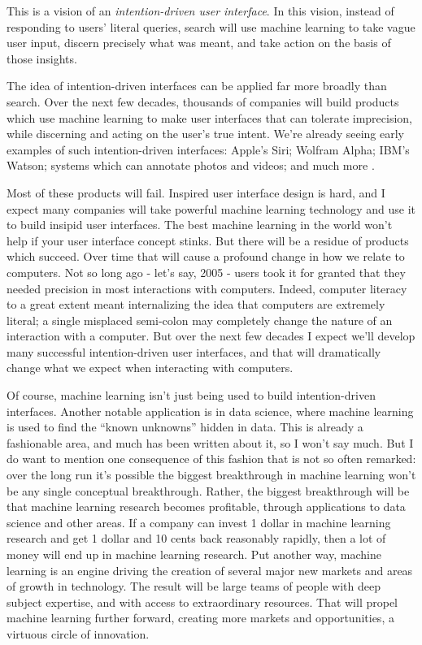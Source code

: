 This is a vision of an \textit{intention-driven user interface}. In this vision, instead of responding to users' literal queries, search will use machine learning to take vague user input, discern precisely what was meant, and take action on the basis of those insights.

The idea of intention-driven interfaces can be applied far more broadly than search. Over the next few decades, thousands of companies will build products which use machine learning to make user interfaces that can tolerate imprecision, while discerning and acting on the user's true intent. We're already seeing early examples of such intention-driven interfaces: Apple's Siri; Wolfram Alpha; IBM's Watson; systems which can annotate photos and videos; and much more \cite{VinyalsTBE2014}.

Most of these products will fail. Inspired user interface design is hard, and I expect many companies will take powerful machine learning technology and use it to build insipid user interfaces. The best machine learning in the world won't help if your user interface concept stinks. But there will be a residue of products which succeed. Over time that will cause a profound change in how we relate to computers. Not so long ago - let's say, 2005 - users took it for granted that they needed precision in most interactions with computers. Indeed, computer literacy to a great extent meant internalizing the idea that computers are extremely literal; a single misplaced semi-colon may completely change the nature of an interaction with a computer. But over the next few decades I expect we'll develop many successful intention-driven user interfaces, and that will dramatically change what we expect when interacting with computers.

 Of course, machine learning isn't just being used to build intention-driven interfaces. Another notable application is in data science, where machine learning is used to find the ``known unknowns'' hidden in data. This is already a fashionable area, and much has been written about it, so I won't say much. But I do want to mention one consequence of this fashion that is not so often remarked: over the long run it's possible the biggest breakthrough in machine learning won't be any single conceptual breakthrough. Rather, the biggest breakthrough will be that machine learning research becomes profitable, through applications to data science and other areas. If a company can invest 1 dollar in machine learning research and get 1 dollar and 10 cents back reasonably rapidly, then a lot of money will end up in machine learning research. Put another way, machine learning is an engine driving the creation of several major new markets and areas of growth in technology. The result will be large teams of people with deep subject expertise, and with access to extraordinary resources. That will propel machine learning further forward, creating more markets and opportunities, a virtuous circle of innovation.

